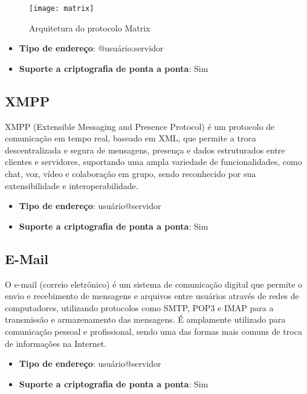 \begin{figure}
  \centering
  \texttt{[image: matrix]}

  \caption{Arquitetura do protocolo Matrix \cite{matrixspec}}
\end{figure}

\begin{itemize}
  \item \textbf{Tipo de endereço}: @usuário:servidor
  \item \textbf{Suporte a criptografia de ponta a ponta}: Sim
\end{itemize}

\subsection{XMPP}

XMPP (Extensible Messaging and Presence Protocol) é um protocolo de comunicação em tempo real, baseado em XML, que permite a troca descentralizada e segura de mensagens, presença e dados estruturados entre clientes e servidores, suportando uma ampla variedade de funcionalidades, como chat, voz, vídeo e colaboração em grupo, sendo reconhecido por sua extensibilidade e interoperabilidade. \cite{xmppspec}

\begin{itemize}
  \item \textbf{Tipo de endereço}: usuário@servidor
  \item \textbf{Suporte a criptografia de ponta a ponta}: Sim
\end{itemize}

\subsection{E-Mail}

O e-mail (correio eletrônico) é um sistema de comunicação digital que permite o envio e recebimento de mensagens e arquivos entre usuários através de redes de computadores, utilizando protocolos como SMTP, POP3 e IMAP para a transmissão e armazenamento das mensagens. É amplamente utilizado para comunicação pessoal e profissional, sendo uma das formas mais comuns de troca de informações na Internet. \cite{rfc5321}

\begin{itemize}
  \item \textbf{Tipo de endereço}: usuário@servidor
  \item \textbf{Suporte a criptografia de ponta a ponta}: Sim
\end{itemize}

